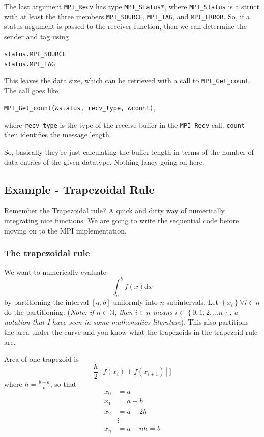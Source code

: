 \documentclass[a4paper]{article}
\begin{document}
The last argument \texttt{MPI\_Recv} has type \texttt{MPI\_Status*},
where \texttt{MPI\_Status} is a struct with at least the three members
\texttt{MPI\_SOURCE}, \texttt{MPI\_TAG}, and \texttt{MPI\_ERROR}.
So, if a status argument is passed to the receiver function, then
we can determine the sender and tag using
\begin{center}
	\texttt{status.MPI\_SOURCE}\\
	\texttt{status.MPI\_TAG}
\end{center}

This leaves the data size, which can be retrieved with a call to
\texttt{MPI\_Get\_count}. The call goes like
\begin{center}
\texttt{MPI\_Get\_count(\&status, recv\_type, \&count)},
\end{center}
where \texttt{recv\_type} is the type of the receive buffer in the 
\texttt{MPI\_Recv} call. \texttt{count} then identifies the message
length.

So, basically they're just calculating the buffer length in terms
of the number of data entries of the given datatype. Nothing fancy
going on here.

\subsection*{Example - Trapezoidal Rule}
Remember the Trapezoidal rule? A quick and dirty way of numerically
integrating nice functions. We are going to write the sequential code
before moving on to the MPI implementation.

\subsubsection*{The trapezoidal rule}
We want to numerically evaluate
\begin{equation}
	\int_a^b f(x) \mathrm{d} x
\end{equation}
by partitioning the interval $\left[ a, b \right] $ uniformly into
$n$ subintervals. Let $\left\{ x_i \right\} \forall i \in n$ do
the partitioning. (\textit{Note: if $n \in  \mathbb{N}$,  then $i \in n$ means $i \in  \left\{ 0, 1, 2, \ldots n \right\} $, a notation
that I have seen in some mathematics literature}). This also
partitions the area under the curve and you know what the trapezoids
in the trapezoid rule are.

Area of one trapezoid is
\begin{equation}
	\frac{h}{2}\left[ f(x_i)+f(x_{i+1}) \right] ]
\end{equation}
where $h = \frac{b-a}{n}$, so that
\begin{equation}
	\begin{split}
		x_0 &= a\\
		x_1 &= a + h\\
		x_2 &= a + 2h\\
		    &\vdots \\
		    x_n &= a + nh = b
	\end{split}
\end{equation}
\end{document}

